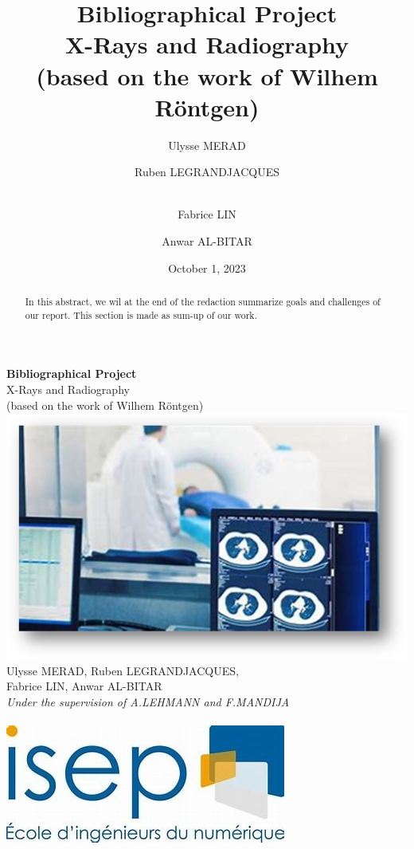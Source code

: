 \documentclass[a4paper,12pt]{report}
\title{Bibliographical Project \\ [1ex]\large X-Rays and Radiography \\ (based on the work of Wilhem Röntgen)  }
\author{Ulysse MERAD\and Ruben LEGRANDJACQUES \and \\Fabrice LIN \and Anwar AL-BITAR}
\date{October 1, 2023}
\begin{document}
\begin{titlepage}
  \centering
  \vspace{3cm}
  \Huge{\textbf{Bibliographical Project}}\\
  \vspace{1cm}
  \Large{X-Rays and Radiography \\ (based on the work of Wilhem Röntgen)} \\
  \vspace{0.5cm}
  \includegraphics[scale=1]{xray.png}\\
  \vspace{0.5cm}
  Ulysse MERAD, Ruben LEGRANDJACQUES, \\ [0.5ex] Fabrice LIN, Anwar AL-BITAR \\
  \vspace{1.5cm}
  \large{\textit {Under the supervision of A.LEHMANN and F.MANDIJA}} \\
  \vspace{1.5cm}
  \thedate \\
  \vspace{2cm}
  \includegraphics[scale=0.6]{Isep.jpg}\\
  
\end{titlepage}



\newpage
\begin{abstract}
  In this abstract, we wil at the end of the redaction summarize goals and challenges of our report. This section is made as sum-up of our work.
\end{abstract}
\tableofcontents
{}
\end{document}
